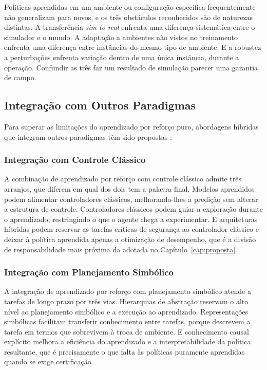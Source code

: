 Políticas aprendidas em um ambiente ou configuração específica frequentemente não
generalizam para novos, e os três obstáculos reconhecidos são de naturezas distintas. A
transferência \textit{sim-to-real} enfrenta uma diferença sistemática entre o simulador e
o mundo. A adaptação a ambientes não vistos no treinamento enfrenta uma diferença entre
instâncias do mesmo tipo de ambiente. E a robustez a perturbações enfrenta variação
dentro de uma única instância, durante a operação. Confundir as três faz um resultado de
simulação parecer uma garantia de campo.

\subsection{Integração com Outros Paradigmas}

Para superar as limitações do aprendizado por reforço puro, abordagens híbridas que integram outros paradigmas têm sido propostas \cite{Kober2013}:

\subsubsection{Integração com Controle Clássico}

A combinação de aprendizado por reforço com controle clássico admite três arranjos, que
diferem em qual dos dois tem a palavra final. Modelos aprendidos podem alimentar
controladores clássicos, melhorando-lhes a predição sem alterar a estrutura de controle.
Controladores clássicos podem guiar a exploração durante o aprendizado, restringindo o
que o agente chega a experimentar. E arquiteturas híbridas podem reservar as tarefas
críticas de segurança ao controlador clássico e deixar à política aprendida apenas a
otimização de desempenho, que é a divisão de responsabilidade mais próxima da adotada no
Capítulo~\ref{cap:proposta}.

\subsubsection{Integração com Planejamento Simbólico}

A integração de aprendizado por reforço com planejamento simbólico atende a tarefas de
longo prazo por três vias. Hierarquias de abstração reservam o alto nível ao planejamento
simbólico e a execução ao aprendizado. Representações simbólicas facilitam transferir
conhecimento entre tarefas, porque descrevem a tarefa em termos que sobrevivem à troca de
ambiente. E conhecimento causal explícito melhora a eficiência do aprendizado e a
interpretabilidade da política resultante, que é precisamente o que falta às políticas
puramente aprendidas quando se exige certificação.

